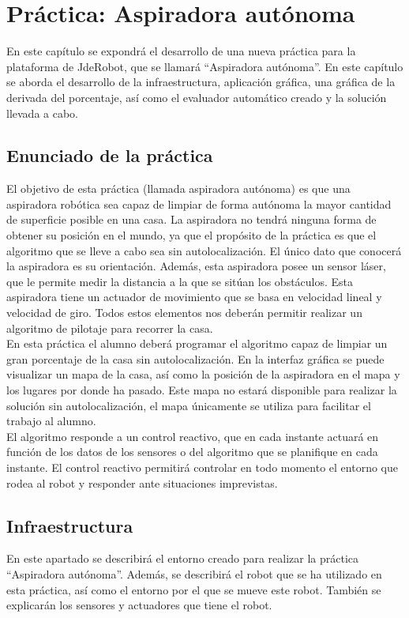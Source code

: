 \chapter{Práctica: Aspiradora autónoma}\label{cap.roomba}
En este capítulo se expondrá el desarrollo de una nueva práctica para la plataforma de JdeRobot, que se llamará ``Aspiradora autónoma''. En este capítulo se aborda el desarrollo de la infraestructura, aplicación gráfica, una gráfica de la derivada del porcentaje, así como el evaluador automático creado y la solución llevada a cabo. 

\section{Enunciado de la práctica} \label{sec.enunciado}
El objetivo de esta práctica (llamada aspiradora autónoma) es que una aspiradora robótica sea capaz de limpiar de forma autónoma la mayor cantidad de superficie posible en una casa. La aspiradora no tendrá ninguna forma de obtener su posición en el mundo, ya que el propósito de la práctica es que el algoritmo que se lleve a cabo sea sin autolocalización. El único dato que conocerá la aspiradora es su orientación.  Además, esta aspiradora posee un sensor láser, que le permite medir la distancia a la que se sitúan los obstáculos. Esta aspiradora tiene un actuador de movimiento que se basa en velocidad lineal y velocidad de giro. Todos estos elementos nos deberán permitir realizar un algoritmo de pilotaje para recorrer la casa.\\

En esta práctica el alumno deberá programar el algoritmo capaz de limpiar un gran porcentaje de la casa sin autolocalización. En la interfaz gráfica se puede visualizar un mapa de la casa, así como la posición de la aspiradora en el mapa y los lugares por donde ha pasado. Este mapa no estará disponible para realizar la solución sin autolocalización, el mapa únicamente se utiliza para facilitar el trabajo al alumno.  \\

El algoritmo responde a un control reactivo, que en cada instante actuará en función de los datos de los sensores o del algoritmo que se planifique en cada instante. El control reactivo permitirá controlar en todo momento el entorno que rodea al robot y responder ante situaciones imprevistas.

\section{Infraestructura}
En este apartado se describirá el entorno creado para realizar la práctica ``Aspiradora autónoma''. Además, se describirá el robot que se ha utilizado en esta práctica, así como el entorno por el que se mueve este robot. También se explicarán los sensores y actuadores que tiene el robot.


